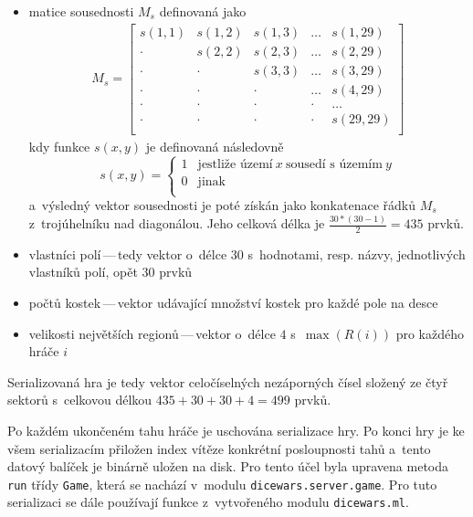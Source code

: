 \documentclass[11pt, a4paper]{article}
\theoremstyle{definition}
\begin{document}
\begin{itemize}
    \item matice sousednosti $M_s$ definovaná jako
    \begin{align*}
        M_s =
        \begin{bmatrix}
            s(1, 1) & s(1, 2) & s(1, 3) & \ldots & s(1, 29) \\
            \cdot   & s(2, 2) & s(2, 3) & \ldots & s(2, 29) \\
            \cdot   & \cdot   & s(3, 3) & \ldots & s(3, 29) \\
            \cdot   & \cdot   & \cdot   & \ldots & s(4, 29) \\
            \cdot   & \cdot   & \cdot   & \cdot  & \ldots   \\
            \cdot   & \cdot   & \cdot   & \cdot  & s(29, 29)\\
        \end{bmatrix}
    \end{align*}
    kdy funkce $s(x, y)$ je definovaná následovně
    \begin{equation*}
        s(x, y) =
        \begin{cases}
            1 & \text{jestliže území}\ x\ \text{sousedí s~územím}\ y\\
            0 & \text{jinak}\\
        \end{cases}
    \end{equation*}
    a~výsledný vektor sousednosti je poté získán jako konkatenace řádků $M_s$ z~trojúhelníku nad diagonálou. Jeho celková délka je $\frac{30 * (30 - 1)}{2} = 435$ prvků.
    \item vlastníci polí\,---\,tedy vektor o~délce $30$ s~hodnotami, resp. názvy, jednotlivých vlastníků polí, opět $30$ prvků
    \item počtů kostek\,---\,vektor udávající množství kostek pro každé pole na desce
    \item velikosti největších regionů\,---\,vektor o~délce $4$ s~$ \max(R(i)) $ pro každého hráče $i$
\end{itemize}

Serializovaná hra je tedy vektor celočíselných nezáporných čísel složený ze čtyř sektorů s~celkovou délkou $435 + 30 + 30 + 4 = 499$ prvků.

Po každém ukončeném tahu hráče je uschována serializace hry.
Po konci hry je ke všem serializacím přiložen index vítěze konkrétní posloupnosti tahů a~tento datový balíček
je binárně uložen na disk. Pro tento účel byla upravena metoda \texttt{run} třídy \texttt{Game}, která se nachází v~modulu
\texttt{dicewars.server.game}. Pro tuto serializaci se dále používají funkce z~vytvořeného modulu
\texttt{dicewars.ml}.
\end{document}
